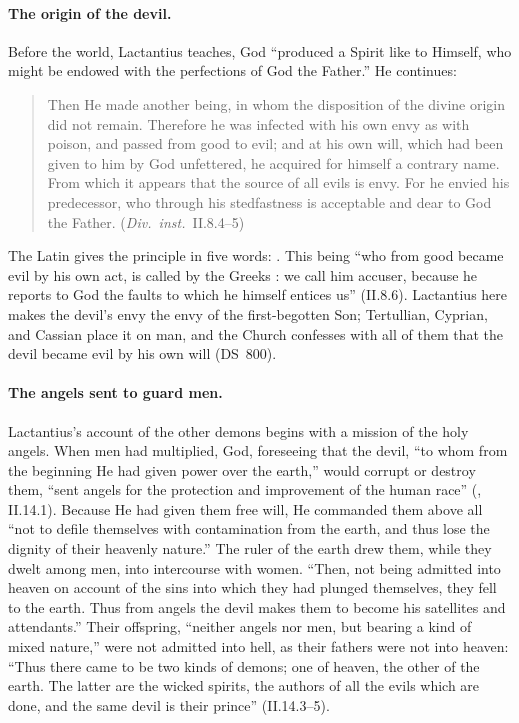 \paragraph{The origin of the devil.} Before the world, Lactantius teaches,
God ``produced a Spirit like to Himself, who might be endowed with the
perfections of God the Father.'' He continues:
\begin{quote}
Then He made another being, in whom the disposition of the divine origin
did not remain. Therefore he was infected with his own envy as with
poison, and passed from good to evil; and at his own will, which had been
given to him by God unfettered, he acquired for himself a contrary name.
From which it appears that the source of all evils is envy. For he envied
his predecessor, who through his stedfastness is acceptable and dear to
God the Father. (\emph{Div.\ inst.}\ II.8.4--5)
\end{quote}
\noindent The Latin gives the principle in five words: . This being ``who from good became evil by
his own act, is called by the Greeks : we call him accuser,
because he reports to God the faults to which he himself entices us''
(II.8.6). Lactantius here makes the devil's envy the envy of the first-begotten Son;
Tertullian, Cyprian, and Cassian place it on man, and the Church confesses
with all of them that the devil became evil by his own will (DS~800).

\paragraph{The angels sent to guard men.} Lactantius's account of the other
demons begins with a mission of the holy angels. When men had multiplied,
God, foreseeing that the devil, ``to whom from the beginning He had given
power over the earth,'' would corrupt or destroy them, ``sent angels for
the protection and improvement of the human race'' (, II.14.1). Because He had given them
free will, He commanded them above all ``not to defile themselves with
contamination from the earth, and thus lose the dignity of their heavenly
nature.'' The ruler of the earth drew them, while they dwelt among men,
into intercourse with women. ``Then, not being admitted into heaven on
account of the sins into which they had plunged themselves, they fell to
the earth. Thus from angels the devil makes them to become his satellites
and attendants.'' Their offspring, ``neither angels nor men, but bearing a
kind of mixed nature,'' were not admitted into hell, as their fathers were
not into heaven: ``Thus there came to be two kinds of demons; one of
heaven, the other of the earth. The latter are the wicked spirits, the
authors of all the evils which are done, and the same devil is their
prince'' (II.14.3--5).

